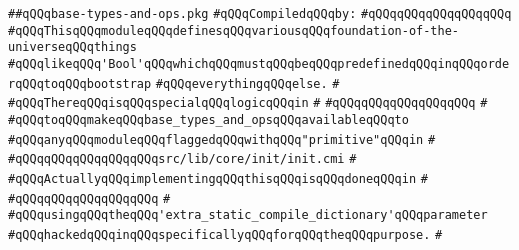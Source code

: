 \label{src/lib/compiler/front/semantic/symbolmapstack/base-types-and-ops.pkg}
\verb|##qQQqbase-types-and-ops.pkg|\newline
\newline
\verb|#qQQqCompiledqQQqby:|\newline
\verb|#qQQqqQQqqQQqqQQqqQQq|\newline
\newline
\newline
\newline
\verb|#qQQqThisqQQqmoduleqQQqdefinesqQQqvariousqQQqfoundation-of-the-universeqQQqthings|\newline
\verb|#qQQqlikeqQQq'Bool'qQQqwhichqQQqmustqQQqbeqQQqpredefinedqQQqinqQQqorderqQQqtoqQQqbootstrap|\newline
\verb|#qQQqeverythingqQQqelse.|\newline
\verb|#|\newline
\verb|#qQQqThereqQQqisqQQqspecialqQQqlogicqQQqin|\newline
\verb|#|\newline
\verb|#qQQqqQQqqQQqqQQqqQQq|\newline
\verb|#|\newline
\verb|#qQQqtoqQQqmakeqQQqbase_types_and_opsqQQqavailableqQQqto|\newline
\verb|#qQQqanyqQQqmoduleqQQqflaggedqQQqwithqQQq"primitive"qQQqin|\newline
\verb|#|\newline
\verb|#qQQqqQQqqQQqqQQqqQQqsrc/lib/core/init/init.cmi|\newline
\verb|#|\newline
\verb|#qQQqActuallyqQQqimplementingqQQqthisqQQqisqQQqdoneqQQqin|\newline
\verb|#|\newline
\verb|#qQQqqQQqqQQqqQQqqQQq|\newline
\verb|#|\newline
\verb|#qQQqusingqQQqtheqQQq'extra_static_compile_dictionary'qQQqparameter|\newline
\verb|#qQQqhackedqQQqinqQQqspecificallyqQQqforqQQqtheqQQqpurpose.|\newline
\verb|#|\newline

